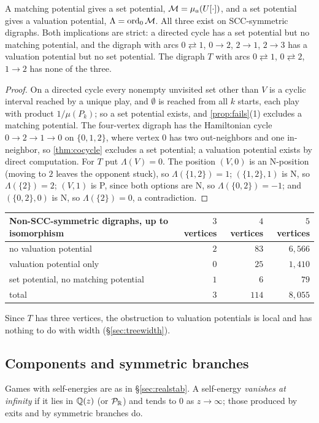 \begin{theorem}[hierarchy]\label{thm:hierarchy}
A matching potential gives a set potential, $\mathcal{M}=\mu_a(U[\cdot])$, and a set potential gives a valuation potential, $\Lambda=\operatorname{ord}_0\mathcal{M}$. All three exist on SCC-symmetric digraphs. Both implications are strict: a directed cycle has a set potential but no matching potential, and the digraph with arcs $0\rightleftarrows1$, $0\to2$, $2\to1$, $2\to3$ has a valuation potential but no set potential. The digraph $T$ with arcs $0\rightleftarrows1$, $0\rightleftarrows2$, $1\to2$ has none of the three.
\end{theorem}
\begin{proof}
On a directed cycle every nonempty unvisited set other than $V$ is a cyclic interval reached by a unique play, and $\emptyset$ is reached from all $k$ starts, each play with product $1/\mu(P_k)$; so a set potential exists, and \cref{prop:fails}(1) excludes a matching potential. The four-vertex digraph has the Hamiltonian cycle $0\to2\to1\to0$ on $\{0,1,2\}$, where vertex $0$ has two out-neighbors and one in-neighbor, so \cref{thm:cocycle} excludes a set potential; a valuation potential exists by direct computation. For $T$ put $\Lambda(V)=0$. The position $(V,0)$ is an N-position (moving to $2$ leaves the opponent stuck), so $\Lambda(\{1,2\})=1$; $(\{1,2\},1)$ is N, so $\Lambda(\{2\})=2$; $(V,1)$ is P, since both options are N, so $\Lambda(\{0,2\})=-1$; and $(\{0,2\},0)$ is N, so $\Lambda(\{2\})=0$, a contradiction.
\end{proof}

\begin{center}\small
\begin{tabular}{@{}lrrr@{}}
\toprule
Non-SCC-symmetric digraphs, up to isomorphism & $3$ vertices & $4$ vertices & $5$ vertices\\ \midrule
no valuation potential & $2$ & $83$ & $6{,}566$\\
valuation potential only & $0$ & $25$ & $1{,}410$\\
set potential, no matching potential & $1$ & $6$ & $79$\\ \midrule
total & $3$ & $114$ & $8{,}055$\\
\bottomrule
\end{tabular}
\end{center}
Since $T$ has three vertices, the obstruction to valuation potentials is local and has nothing to do with width (\S\ref{sec:treewidth}).

\subsection{Components and symmetric branches}
Games with self-energies are as in \S\ref{sec:realstab}. A self-energy \emph{vanishes at infinity} if it lies in $\mathbb{Q}(z)$ (or $\mathcal{P}_{\mathbb{R}}$) and tends to $0$ as $z\to\infty$; those produced by exits and by symmetric branches do.

